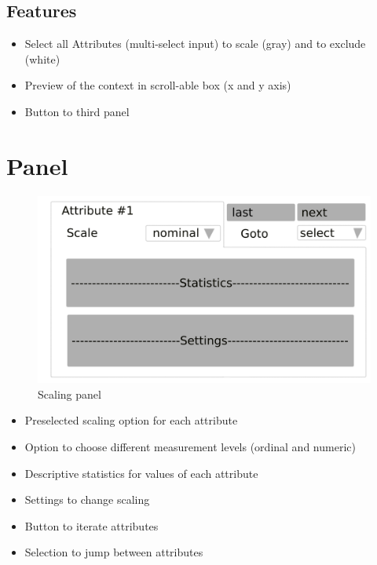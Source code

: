 \documentclass[]{article}
\begin{document}
\subsection{Features}
\begin{itemize}
	\item Select all Attributes (multi-select input) to scale (gray) and to exclude (white)
	\item Preview of the context in scroll-able box (x and y axis)
	\item Button to third panel
\end{itemize}

\newpage
\section{Panel}
\begin{figure}[H]
	\includegraphics[width=\linewidth]{panel-3.png}
	\caption{Scaling panel}
	\label{fig:p2}
\end{figure}
\begin{itemize}
	\item Preselected scaling option for each attribute
	\item Option to choose different measurement levels (ordinal and numeric)
	\item Descriptive statistics for values of each attribute
	\item Settings to change scaling
	\item Button to iterate attributes
	\item Selection to jump between attributes
\end{itemize}
\end{document}
